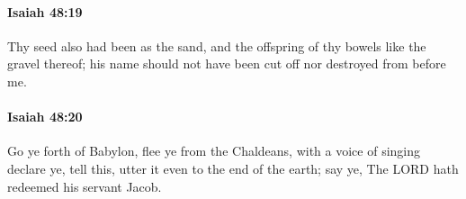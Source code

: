 		\paragraph{Isaiah 48:19} %
			\label{ISAIAH-48-19}

			Thy seed also had been as the sand, and the offspring of thy bowels like the gravel thereof; his name should not have been cut off nor destroyed from before me.


		\paragraph{Isaiah 48:20} %
			\label{ISAIAH-48-20}

			Go ye forth of Babylon, flee ye from the Chaldeans, with a voice of singing declare ye, tell this, utter it even to the end of the earth; say ye, The LORD hath redeemed his servant Jacob.


